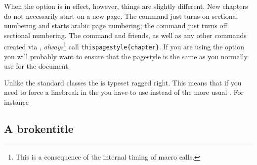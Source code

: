     When the  option is in effect, however, things are slightly
different. New chapters do not necessarily start on a new page.
The \cmd{\mainmatter} command
just turns on sectional numbering and starts arabic page numbering; the 
\cmd{\backmatter} command just turns off sectional numbering.
    The \cmd{\tableofcontents} command and friends, as well as any
other commands created via \cmd{\newlistof}, 
\emph{always}\footnote{This is a consequence of the internal
timing of macro calls.}
call \verb?thispagestyle{chapter}?. If you are using the 
 option you
will probably want to ensure that the  pagestyle is the
same as you normally use for the document.

    Unlike the standard classes the  is typeset ragged right.
This means that if you need to force a linebreak in the  you 
have to use \cmd{\newline} instead of the more usual \cmd{\\}. For instance
\begin{lcode}
\section{A broken\newline title}
\end{lcode}

